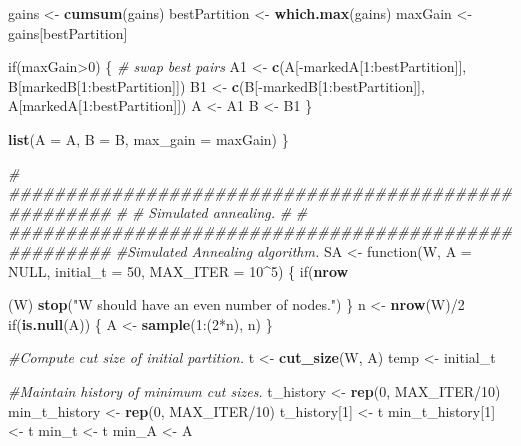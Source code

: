 \documentclass[11pt,]{article}
\newenvironment{Shaded}{\begin{snugshade}}{\end{snugshade}}
\newcommand{\KeywordTok}[1]{\textcolor[rgb]{0.13,0.29,0.53}{\textbf{{#1}}}}
\newcommand{\DataTypeTok}[1]{\textcolor[rgb]{0.13,0.29,0.53}{{#1}}}
\newcommand{\DecValTok}[1]{\textcolor[rgb]{0.00,0.00,0.81}{{#1}}}
\newcommand{\StringTok}[1]{\textcolor[rgb]{0.31,0.60,0.02}{{#1}}}
\newcommand{\CommentTok}[1]{\textcolor[rgb]{0.56,0.35,0.01}{\textit{{#1}}}}
\newcommand{\OtherTok}[1]{\textcolor[rgb]{0.56,0.35,0.01}{{#1}}}
\newcommand{\NormalTok}[1]{{#1}}
\begin{document}
\begin{Shaded}
\begin{Highlighting}[]
  \NormalTok{gains <-}\StringTok{ }\KeywordTok{cumsum}\NormalTok{(gains)}
  \NormalTok{bestPartition <-}\StringTok{ }\KeywordTok{which.max}\NormalTok{(gains)}
  \NormalTok{maxGain <-}\StringTok{ }\NormalTok{gains[bestPartition]}
  
  \NormalTok{if(maxGain>}\DecValTok{0}\NormalTok{) \{ }
    \CommentTok{# swap best pairs}
    \NormalTok{A1 <-}\StringTok{ }\KeywordTok{c}\NormalTok{(A[-markedA[}\DecValTok{1}\NormalTok{:bestPartition]], }
            \NormalTok{B[markedB[}\DecValTok{1}\NormalTok{:bestPartition]])}
    \NormalTok{B1 <-}\StringTok{ }\KeywordTok{c}\NormalTok{(B[-markedB[}\DecValTok{1}\NormalTok{:bestPartition]], }
            \NormalTok{A[markedA[}\DecValTok{1}\NormalTok{:bestPartition]])}
    \NormalTok{A <-}\StringTok{ }\NormalTok{A1}
    \NormalTok{B <-}\StringTok{ }\NormalTok{B1}
  \NormalTok{\}}
  
  \KeywordTok{list}\NormalTok{(}\DataTypeTok{A =} \NormalTok{A, }\DataTypeTok{B =} \NormalTok{B, }\DataTypeTok{max_gain =} \NormalTok{maxGain)}
\NormalTok{\}}


\CommentTok{# #####################################################}
\CommentTok{#}
\CommentTok{# Simulated annealing.}
\CommentTok{#}
\CommentTok{# #####################################################}
\CommentTok{#Simulated Annealing algorithm.}
\NormalTok{SA <-}\StringTok{ }\NormalTok{function(W, }\DataTypeTok{A =} \OtherTok{NULL}\NormalTok{, }\DataTypeTok{initial_t =} \DecValTok{50}\NormalTok{, }\DataTypeTok{MAX_ITER =} \DecValTok{10}\NormalTok{^}\DecValTok{5}\NormalTok{) \{}
  \NormalTok{if(}\KeywordTok{nrow}\NormalTok{(W) %
    \KeywordTok{stop}\NormalTok{(}\StringTok{"W should have an even number of nodes."}\NormalTok{)}
  \NormalTok{\}}
  \NormalTok{n <-}\StringTok{ }\KeywordTok{nrow}\NormalTok{(W)/}\DecValTok{2} 
  \NormalTok{if(}\KeywordTok{is.null}\NormalTok{(A)) \{}
    \NormalTok{A <-}\StringTok{ }\KeywordTok{sample}\NormalTok{(}\DecValTok{1}\NormalTok{:(}\DecValTok{2}\NormalTok{*n), n)}
  \NormalTok{\}}
  
  \CommentTok{#Compute cut size of initial partition.}
  \NormalTok{t <-}\StringTok{ }\KeywordTok{cut_size}\NormalTok{(W, A)}
  \NormalTok{temp <-}\StringTok{ }\NormalTok{initial_t}
  
  \CommentTok{#Maintain history of minimum cut sizes.}
  \NormalTok{t_history <-}\StringTok{ }\KeywordTok{rep}\NormalTok{(}\DecValTok{0}\NormalTok{, MAX_ITER/}\DecValTok{10}\NormalTok{)}
  \NormalTok{min_t_history <-}\StringTok{ }\KeywordTok{rep}\NormalTok{(}\DecValTok{0}\NormalTok{, MAX_ITER/}\DecValTok{10}\NormalTok{)}
  \NormalTok{t_history[}\DecValTok{1}\NormalTok{] <-}\StringTok{ }\NormalTok{t}
  \NormalTok{min_t_history[}\DecValTok{1}\NormalTok{] <-}\StringTok{ }\NormalTok{t}
  \NormalTok{min_t <-}\StringTok{ }\NormalTok{t}
  \NormalTok{min_A <-}\StringTok{ }\NormalTok{A}
  
}
\end{Highlighting}
\end{Shaded}
\end{document}
